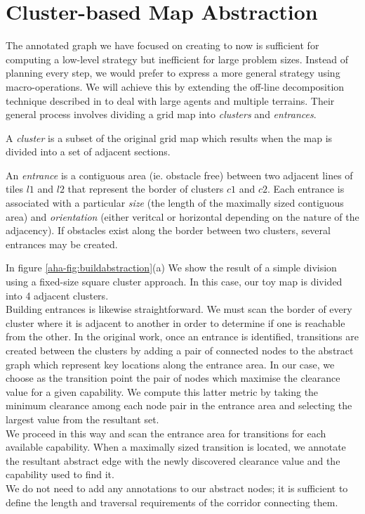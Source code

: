 \section{Cluster-based Map Abstraction}
\label{aha:mapabstraction}
The annotated graph we have focused on creating to now is sufficient for computing a low-level strategy but inefficient for large problem sizes. 
Instead of planning every step, we would prefer to express a more general strategy using macro-operations.
We will achieve this by extending the off-line decomposition technique described in \cite{botea04} to deal with large agents and multiple terrains. Their general process involves dividing a grid map into \emph{clusters} and \emph{entrances}. 
\begin{definition}
A \emph{cluster} is a subset of the original grid map which results when the map is divided into a set of adjacent sections. 
\end{definition}

\begin{definition}
An \emph{entrance} is a contiguous area (ie. obstacle free) between two adjacent lines of tiles $l1$ and $l2$ that represent the border of clusters $c1$ and $c2$. 
Each entrance is associated with a particular \emph{size} (the length of the maximally sized contiguous area) and \emph{orientation} (either veritcal or horizontal depending on the nature of the adjacency). If obstacles exist along the border between two clusters, several entrances may be created.
\end{definition}

In figure \ref{aha-fig:buildabstraction}(a) We show the result of a simple division using a fixed-size square cluster approach. In this case, our toy map is divided into 4 adjacent clusters. \\ \newline
Building entrances is likewise straightforward. We must scan the border of every cluster where it is adjacent to another in order to determine if one is reachable from the other. In the original work, once an entrance is identified, transitions are created between the clusters by adding a pair of connected nodes to the abstract graph which represent key locations along the entrance area. In our case, we choose as the transition point the pair of nodes which maximise the clearance value for a given capability. We compute this latter metric by taking the minimum clearance among each node pair in the entrance area and selecting the largest value from the resultant set. \\ \newline
We proceed in this way and scan the entrance area for transitions for each available capability. When a maximally sized transition is located, we annotate the resultant abstract edge with the newly discovered clearance value and the capability used to find it. \\
We do not need to add any annotations to our abstract nodes; it is sufficient to define the length and traversal requirements of the corridor connecting them.  

